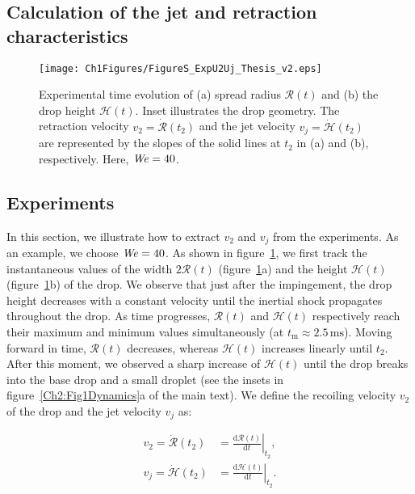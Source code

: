 \begin{subappendices}
	\pagebreak 
	
	\section{Calculation of the jet and retraction characteristics}\label{Ch2:SecDetails}
	
	\begin{figure}
		\texttt{[image: Ch1Figures/FigureS\_ExpU2Uj\_Thesis\_v2.eps]}
		\caption{Experimental time evolution of (a) spread radius $\mathcal{R}(t)$ and (b) the drop height $\mathcal{H}(t)$. Inset illustrates the drop geometry. The retraction velocity $v_2 = \dot{\mathcal{R}}(t_2)$ and the jet velocity $v_j = \dot{\mathcal{H}}(t_2)$ are represented by the slopes of the solid lines at $t_2$ in (a) and (b), respectively. Here, $\mathit{We} = 40$.}
		\label{Ch2:Fig_ExpU2Uj}
	\end{figure}
	
	\subsection{Experiments}	
	In this section, we illustrate how to extract $v_2$ and $v_j$ from the experiments. As an example, we choose $\mathit{We} = 40$. As shown in figure~\ref{Ch2:Fig_ExpU2Uj}, we first track the instantaneous values of the width $2\mathcal{R}(t)$ (figure~\ref{Ch2:Fig_ExpU2Uj}a) and the height $\mathcal{H}(t)$ (figure~\ref{Ch2:Fig_ExpU2Uj}b) of the drop. We observe that just after the impingement, the drop height decreases with a constant velocity \cite{eggers2010drop, Gordillo2018} until the inertial shock propagates throughout the drop. As time progresses, $\mathcal{R}(t)$ and $\mathcal{H}(t)$ respectively reach their maximum and minimum values simultaneously (at $t_{\mathrm{m}} \approx 2.5\,\si{\milli\second}$). Moving forward in time, $\mathcal{R}(t)$ decreases, whereas $\mathcal{H}(t)$ increases linearly until $t_2$. After this moment, we observed a sharp increase of $\mathcal{H}(t)$ until the drop breaks into the base drop and a small droplet (see the insets in figure~\ref{Ch2:Fig1Dynamics}a of the main text). We define the recoiling velocity $v_2$ of the drop and the jet velocity $v_j$ as:
	
	\begin{align}
		v_2 = \dot{\mathcal{R}}(t_2) &= \left. \frac{\mathrm{d}\mathcal{R}(t)}{\mathrm{d}t} \right|_{t_2},\\
		v_j = \dot{\mathcal{H}}(t_2) &= \left. \frac{\mathrm{d}\mathcal{H}(t)}{\mathrm{d}t} \right|_{t_2}.
	\end{align}
	

\end{subappendices}

